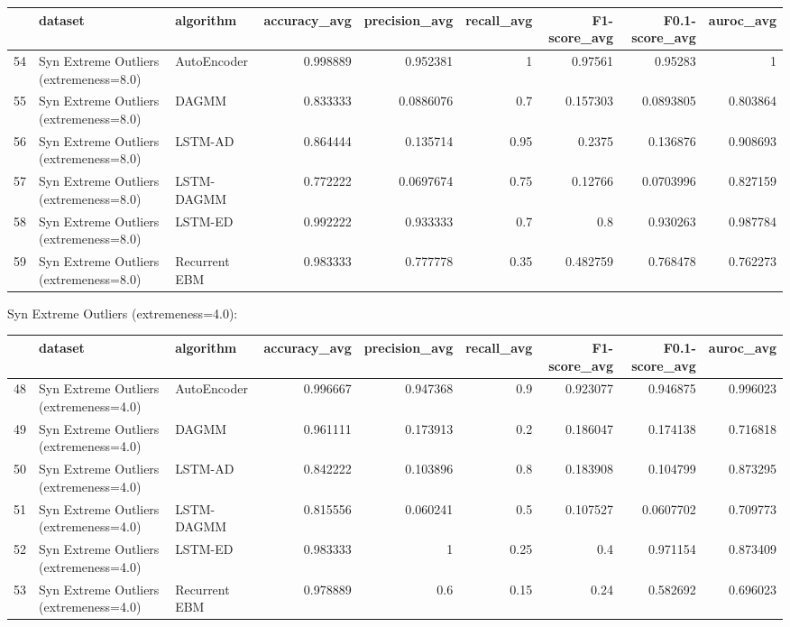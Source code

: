 \begin{tabular}{rllrrrrrr}
\hline
    & dataset                                & algorithm     &   accuracy\_avg &   precision\_avg &   recall\_avg &   F1-score\_avg &   F0.1-score\_avg &   auroc\_avg \\
\hline
 54 & Syn Extreme Outliers (extremeness=8.0) & AutoEncoder   &       0.998889 &       0.952381  &         1    &       0.97561  &        0.95283   &    1        \\
 55 & Syn Extreme Outliers (extremeness=8.0) & DAGMM         &       0.833333 &       0.0886076 &         0.7  &       0.157303 &        0.0893805 &    0.803864 \\
 56 & Syn Extreme Outliers (extremeness=8.0) & LSTM-AD       &       0.864444 &       0.135714  &         0.95 &       0.2375   &        0.136876  &    0.908693 \\
 57 & Syn Extreme Outliers (extremeness=8.0) & LSTM-DAGMM    &       0.772222 &       0.0697674 &         0.75 &       0.12766  &        0.0703996 &    0.827159 \\
 58 & Syn Extreme Outliers (extremeness=8.0) & LSTM-ED       &       0.992222 &       0.933333  &         0.7  &       0.8      &        0.930263  &    0.987784 \\
 59 & Syn Extreme Outliers (extremeness=8.0) & Recurrent EBM &       0.983333 &       0.777778  &         0.35 &       0.482759 &        0.768478  &    0.762273 \\
\hline
\end{tabular}

Syn Extreme Outliers (extremeness=4.0):

\begin{tabular}{rllrrrrrr}
\hline
    & dataset                                & algorithm     &   accuracy\_avg &   precision\_avg &   recall\_avg &   F1-score\_avg &   F0.1-score\_avg &   auroc\_avg \\
\hline
 48 & Syn Extreme Outliers (extremeness=4.0) & AutoEncoder   &       0.996667 &        0.947368 &         0.9  &       0.923077 &        0.946875  &    0.996023 \\
 49 & Syn Extreme Outliers (extremeness=4.0) & DAGMM         &       0.961111 &        0.173913 &         0.2  &       0.186047 &        0.174138  &    0.716818 \\
 50 & Syn Extreme Outliers (extremeness=4.0) & LSTM-AD       &       0.842222 &        0.103896 &         0.8  &       0.183908 &        0.104799  &    0.873295 \\
 51 & Syn Extreme Outliers (extremeness=4.0) & LSTM-DAGMM    &       0.815556 &        0.060241 &         0.5  &       0.107527 &        0.0607702 &    0.709773 \\
 52 & Syn Extreme Outliers (extremeness=4.0) & LSTM-ED       &       0.983333 &        1        &         0.25 &       0.4      &        0.971154  &    0.873409 \\
 53 & Syn Extreme Outliers (extremeness=4.0) & Recurrent EBM &       0.978889 &        0.6      &         0.15 &       0.24     &        0.582692  &    0.696023 \\
\hline
\end{tabular}

